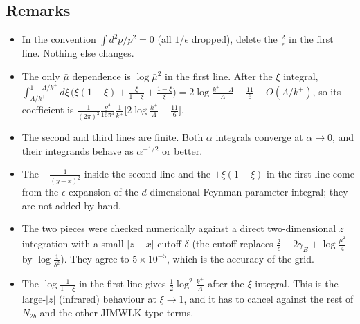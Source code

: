 \documentclass[10pt]{article}
\begin{document}
\subsection*{Remarks}
\begin{itemize}
\item In the convention $\int d^{2}p/p^{2}=0$ (all $1/\epsilon$ dropped), delete the $\frac{2}{\epsilon}$ in the first line. Nothing else changes.
\item The only $\bar\mu$ dependence is $\log\bar\mu^{2}$ in the first line. After the $\xi$ integral, $\int_{\Lambda/k^{+}}^{1-\Lambda/k^{+}}d\xi\,\big(\xi(1-\xi)+\frac{\xi}{1-\xi}+\frac{1-\xi}{\xi}\big)=2\log\frac{k^{+}-\Lambda}{\Lambda}-\frac{11}{6}+O(\Lambda/k^{+})$, so its coefficient is $\frac{1}{(2\pi)^{3}}\frac{g^{4}}{16\pi^{4}}\frac{1}{k^{+}}\big[2\log\frac{k^{+}}{\Lambda}-\frac{11}{6}\big]$.
\item The second and third lines are finite. Both $\alpha$ integrals converge at $\alpha\to0$, and their integrands behave as $\alpha^{-1/2}$ or better.
\item The $-\frac{1}{(y-x)^{2}}$ inside the second line and the $+\xi(1-\xi)$ in the first line come from the $\epsilon$-expansion of the $d$-dimensional Feynman-parameter integral; they are not added by hand.
\item The two pieces were checked numerically against a direct two-dimensional $z$ integration with a small-$|z-x|$ cutoff $\delta$ (the cutoff replaces $\frac{2}{\epsilon}+2\gamma_{E}+\log\frac{\bar\mu^{2}}{4}$ by $\log\frac{1}{\delta^{2}}$). They agree to $5\times10^{-5}$, which is the accuracy of the grid.
\item The $\log\frac{1}{1-\xi}$ in the first line gives $\frac12\log^{2}\frac{k^{+}}{\Lambda}$ after the $\xi$ integral. This is the large-$|z|$ (infrared) behaviour at $\xi\to1$, and it has to cancel against the rest of $N_{2b}$ and the other JIMWLK-type terms.
\end{itemize}
\end{document}
